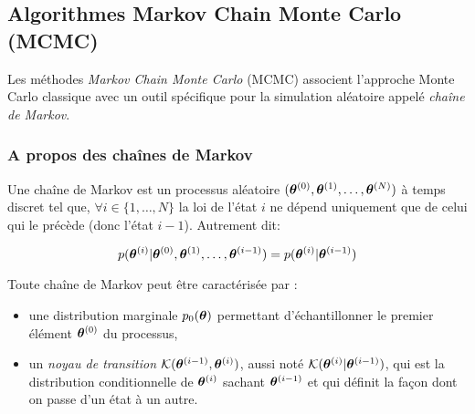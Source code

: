 \subsection{Algorithmes Markov Chain Monte Carlo (MCMC)}

Les méthodes \textit{Markov Chain Monte Carlo} (MCMC) associent l'approche Monte Carlo classique avec un outil spécifique pour la simulation aléatoire appelé \textit{chaîne de Markov}.\\

\subsubsection{A propos des chaînes de Markov}

Une chaîne de Markov est un processus aléatoire  $({\bm{\theta}}^{(0)}, {\bm{\theta}}^{(1)}, \dots, {\bm{\theta}}^{(N)})$ à temps discret tel que, $\forall i \in \{1, \dots, N\}$ la loi de l'état $i$ ne dépend uniquement que de celui qui le précède (donc l'état $i-1$). Autrement dit:

\begin{equation}
p({{\bm{\theta}}^{(i)}} | {\bm{\theta}}^{(0)}, {\bm{\theta}}^{(1)}, \dots, {{\bm{\theta}}^{(i-1)}}) = p({{\bm{\theta}}^{(i)}}|{{\bm{\theta}}^{(i-1)}})
\label{eq_propriete_markov}
\end{equation}

Toute chaîne de Markov peut être caractérisée par :
\begin{itemize}
	\item une distribution marginale $p_0({\bm{\theta}})$ permettant d'échantillonner le premier élément ${\bm{\theta}}^{(0)}$ du processus,
	\item un \textit{noyau de transition} ${\mathcal{K}}({{\bm{\theta}}^{(i-1)}},{{\bm{\theta}}^{(i)}})$, aussi noté ${\mathcal{K}}({{\bm{\theta}}^{(i)}}|{{\bm{\theta}}^{(i-1)}})$, qui est la distribution conditionnelle de ${{\bm{\theta}}^{(i)}}$ sachant ${{\bm{\theta}}^{(i-1)}}$ et qui définit la façon dont on passe d'un état à un autre.\\
\end{itemize}

